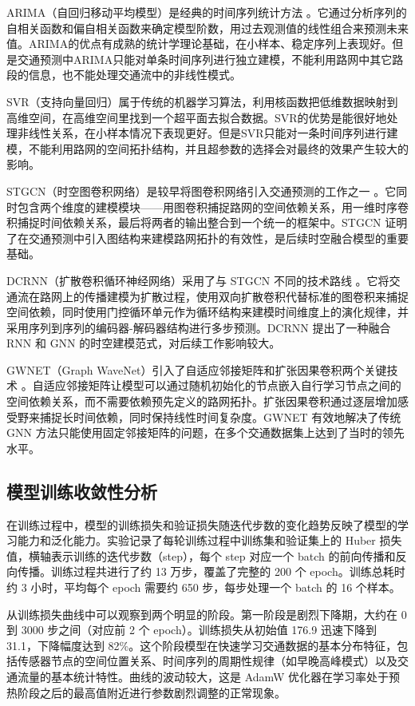 ARIMA（自回归移动平均模型）是经典的时间序列统计方法 。它通过分析序列的自相关函数和偏自相关函数来确定模型阶数，用过去观测值的线性组合来预测未来值。ARIMA的优点有成熟的统计学理论基础，在小样本、稳定序列上表现好。但是交通预测中ARIMA只能对单条时间序列进行独立建模，不能利用路网中其它路段的信息，也不能处理交通流中的非线性模式。

SVR（支持向量回归）属于传统的机器学习算法，利用核函数把低维数据映射到高维空间，在高维空间里找到一个超平面去拟合数据。SVR的优势是能很好地处理非线性关系，在小样本情况下表现更好。但是SVR只能对一条时间序列进行建模，不能利用路网的空间拓扑结构，并且超参数的选择会对最终的效果产生较大的影响。

STGCN（时空图卷积网络）是较早将图卷积网络引入交通预测的工作之一 。它同时包含两个维度的建模模块——用图卷积捕捉路网的空间依赖关系，用一维时序卷积捕捉时间依赖关系，最后将两者的输出整合到一个统一的框架中。STGCN 证明了在交通预测中引入图结构来建模路网拓扑的有效性，是后续时空融合模型的重要基础。

DCRNN（扩散卷积循环神经网络）采用了与 STGCN 不同的技术路线 。它将交通流在路网上的传播建模为扩散过程，使用双向扩散卷积代替标准的图卷积来捕捉空间依赖，同时使用门控循环单元作为循环结构来建模时间维度上的演化规律，并采用序列到序列的编码器-解码器结构进行多步预测。DCRNN 提出了一种融合 RNN 和 GNN 的时空建模范式，对后续工作影响较大。

GWNET（Graph WaveNet）引入了自适应邻接矩阵和扩张因果卷积两个关键技术 。自适应邻接矩阵让模型可以通过随机初始化的节点嵌入自行学习节点之间的空间依赖关系，而不需要依赖预先定义的路网拓扑。扩张因果卷积通过逐层增加感受野来捕捉长时间依赖，同时保持线性时间复杂度。GWNET 有效地解决了传统 GNN 方法只能使用固定邻接矩阵的问题，在多个交通数据集上达到了当时的领先水平。

\subsection{模型训练收敛性分析}

在训练过程中，模型的训练损失和验证损失随迭代步数的变化趋势反映了模型的学习能力和泛化能力。实验记录了每轮训练过程中训练集和验证集上的 Huber 损失值，横轴表示训练的迭代步数（step），每个 step 对应一个 batch 的前向传播和反向传播。训练过程共进行了约 13 万步，覆盖了完整的 200 个 epoch。训练总耗时约 3 小时，平均每个 epoch 需要约 650 步，每步处理一个 batch 的 16 个样本。

从训练损失曲线中可以观察到两个明显的阶段。第一阶段是剧烈下降期，大约在 0 到 3000 步之间（对应前 2 个 epoch）。训练损失从初始值 176.9 迅速下降到 31.1，下降幅度达到 82\%。这个阶段模型在快速学习交通数据的基本分布特征，包括传感器节点的空间位置关系、时间序列的周期性规律（如早晚高峰模式）以及交通流量的基本统计特性。曲线的波动较大，这是 AdamW 优化器在学习率处于预热阶段之后的最高值附近进行参数剧烈调整的正常现象。

